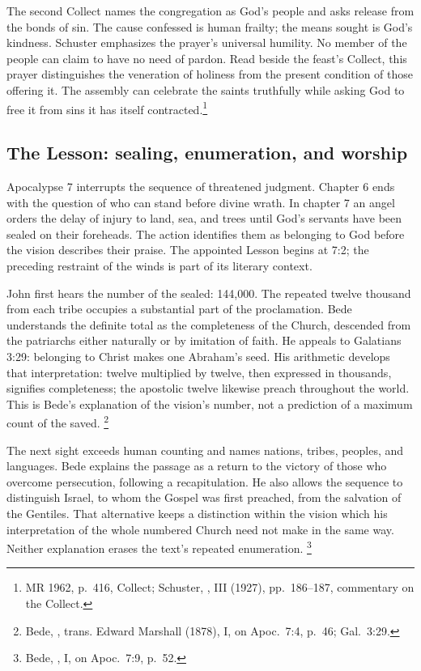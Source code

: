 The second Collect names the congregation as God's people and asks release
from the bonds of sin. The cause confessed is human frailty; the means sought
is God's kindness. Schuster emphasizes the prayer's universal humility. No
member of the people can claim to have no need of pardon. Read beside the
feast's Collect, this prayer distinguishes the veneration of holiness from
the present condition of those offering it. The assembly can celebrate the
saints truthfully while asking God to free it from sins it has itself
contracted.\footnote{MR 1962, p.~416, Collect; Schuster,
, III (1927), pp.~186--187, commentary on the Collect.}

\subsection{The Lesson: sealing, enumeration, and worship}
Apocalypse 7 interrupts the sequence of threatened judgment. Chapter 6 ends
with the question of who can stand before divine wrath. In chapter 7 an angel
orders the delay of injury to land, sea, and trees until God's servants have
been sealed on their foreheads. The action identifies them as belonging to
God before the vision describes their praise. The appointed Lesson begins
at 7:2; the preceding restraint of the winds is part of its literary context.

John first hears the number of the sealed: 144,000. The repeated twelve
thousand from each tribe occupies a substantial part of the proclamation.
Bede understands the definite total as the completeness of the Church,
descended from the patriarchs either naturally or by imitation of faith.
He appeals to Galatians 3:29: belonging to Christ makes one Abraham's seed.
His arithmetic develops that interpretation: twelve multiplied by twelve,
then expressed in thousands, signifies completeness; the apostolic twelve
likewise preach throughout the world. This is Bede's explanation of the
vision's number, not a prediction of a maximum count of the saved.
\footnote{Bede, , trans. Edward
Marshall (1878), I, on Apoc.~7:4, p.~46; Gal.~3:29.}

The next sight exceeds human counting and names nations, tribes, peoples, and
languages. Bede explains the passage as a return to the victory of those who
overcome persecution, following a recapitulation. He also allows the sequence
to distinguish Israel, to whom the Gospel was first preached, from the
salvation of the Gentiles. That alternative keeps a distinction within the
vision which his interpretation of the whole numbered Church need not make
in the same way. Neither explanation erases the text's repeated enumeration.
\footnote{Bede, , I, on Apoc.~7:9, p.~52.}

